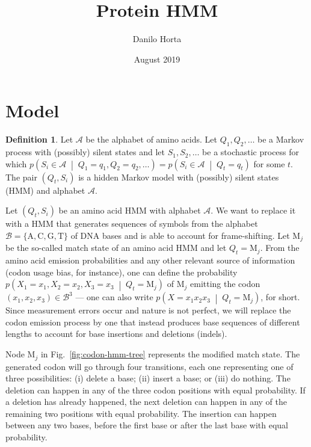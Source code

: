 \documentclass[a4paper]{article}
\title{Protein HMM}
\author{Danilo Horta}
\date{August 2019}
\theoremstyle{definition}
\theoremstyle{definition}
\newtheorem{definition}{Definition}[section]
\newcommand{\cprob}[2]{p\left(#1\;\middle|\; #2\right)}
\begin{document}
\maketitle

\section{Model}

\begin{definition}
Let $\mathcal A$ be the alphabet of amino acids.
Let $Q_1, Q_2, \dots$ be a Markov process with (possibly) silent states and let $S_1, S_2, \dots$ be a stochastic process for which
$\cprob{S_i\in\mathcal A}{Q_1=q_1, Q_2=q_2, \dots} = \cprob{S_i\in\mathcal A}{Q_t=q_t}$ for some $t$.
The pair $(Q_t, S_i)$ is a hidden Markov model with (possibly) silent states (HMM) and alphabet $\mathcal A$.
\end{definition}

Let $(Q_t, S_i)$ be an amino acid HMM with alphabet $\mathcal A$.
We want to replace it with a HMM that generates sequences of symbols from the alphabet
$\mathcal B = \{\mathrm A, \mathrm C, \mathrm G, \mathrm T\}$ of DNA bases and is able to account
for frame-shifting.
Let $\mathrm M_j$ be the so-called match state of an amino acid HMM and let $Q_t=\mathrm M_j$.
From the amino acid emission probabilities and any other relevant source of information
(codon usage bias, for instance), one can define the probability $\cprob{X_1=x_1, X_2=x_2, X_3=x_3}{Q_t=\mathrm M_j}$
of $\mathrm M_j$ emitting the codon $(x_1, x_2, x_3) \in \mathcal B^3$
--- one can also write $\cprob{X=x_1x_2x_3}{Q_t=\mathrm M_j}$, for short.
Since measurement errors occur and nature is not perfect, we will replace the
codon emission process by one that instead produces base sequences of different
lengths to account for base insertions and deletions (indels).

Node $\mathrm M_j$ in Fig.~\ref{fig:codon-hmm-tree} represents the modified match state.
The generated codon will go through four transitions, each one representing one of three possibilities: (i) delete a base; (ii) insert a base; or (iii) do nothing.
The deletion can happen in any of the three codon positions with equal probability.
If a deletion has already happened, the next deletion can happen in any of the remaining two positions with equal probability.
The insertion can happen between any two bases, before the first base or after the last base with equal probability.
\end{document}
